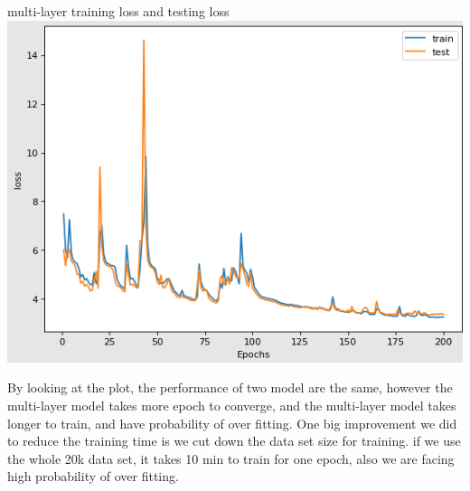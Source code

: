 \documentclass{article}
\begin{document}
\begin{center}
    multi-layer training loss and testing loss 
    \includegraphics[scale=0.7]{mutil_loss.png}
\end{center}
By looking at the plot, the performance of two model are the same, however the multi-layer model takes more epoch to converge, and the multi-layer model takes longer to train, and have probability of over fitting. One big improvement we did to reduce the training time is we cut down the data set size for training. if we use the whole 20k data set, it takes 10 min to train for one epoch, also we are facing high probability of over fitting. 
\end{document}
